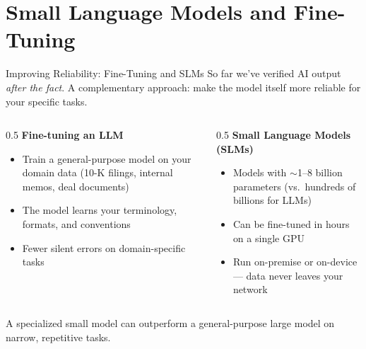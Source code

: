 \documentclass[aspectratio=169]{beamer}
\begin{document}
\section{Small Language Models and Fine-Tuning}

\begin{frame}{Improving Reliability: Fine-Tuning and SLMs}
So far we've verified AI output \textit{after the fact}.  A complementary approach: make the model itself more reliable for your specific tasks.
\vspace{0.3cm}
\begin{columns}[T]
\begin{column}{0.5\textwidth}
\textbf{Fine-tuning an LLM}
\begin{itemize}\small
  \item Train a general-purpose model on your domain data (10-K filings, internal memos, deal documents)
  \item The model learns your terminology, formats, and conventions
  \item Fewer silent errors on domain-specific tasks
\end{itemize}
\end{column}
\begin{column}{0.5\textwidth}
\textbf{Small Language Models (SLMs)}
\begin{itemize}\small
  \item Models with $\sim$1--8 billion parameters (vs.\ hundreds of billions for LLMs)
  \item Can be fine-tuned in hours on a single GPU
  \item Run on-premise or on-device --- \alert{data never leaves your network}
\end{itemize}
\end{column}
\end{columns}
\vspace{0.3cm}
\alert{A specialized small model can outperform a general-purpose large model on narrow, repetitive tasks.}
\end{frame}
\end{document}
